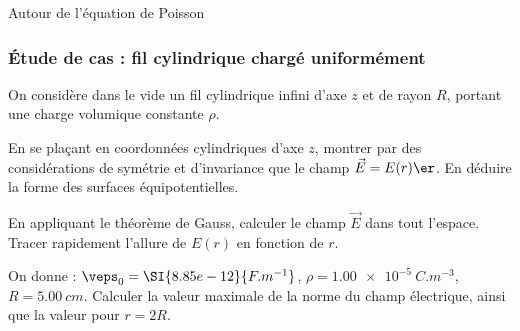 \begin{exo}[PC][1][devoir]{Autour de l’équation de Poisson}
  
  \subsubsection{Étude de cas : fil cylindrique chargé uniformément}
  On considère dans le vide un fil cylindrique infini d’axe $z$ et de rayon $R$, portant une charge volumique
  constante $\rho$.
  
  \begin{quest}
    \item  En se plaçant en coordonnées cylindriques d’axe $z$, montrer par des considérations de symétrie
  et d’invariance que le champ $\Vec{E} = E(r) \er$. En déduire la forme des surfaces équipotentielles.
  \item  En appliquant le théorème de Gauss, calculer le champ $\Vec{E}$ dans tout l’espace. Tracer rapidement
  l’allure de $E(r)$ en fonction de $r$.
  
  \item On donne : $\veps_0 = \SI{8.85e-12}{F.m^{-1}}$, $\rho = \SI{1.00e-5}{C.m^{-3}}$, $R = \SI{5.00}{cm}$. Calculer la valeur
  maximale de la norme du champ électrique, ainsi que la valeur pour $r = 2R$.
  \end{quest}
  

\end{exo}
